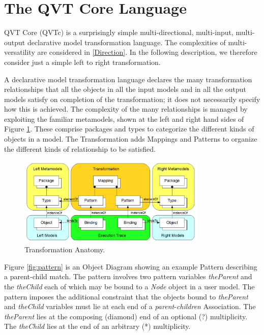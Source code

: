 %
\section{The QVT Core Language}\label{sec:qvtcore}
QVT Core (QVTc) is a surprisingly simple multi-directional, multi-input, multi-output declarative model transformation language. The complexities of multi-versatility are considered in \ref{Direction}. In the following description, we therefore consider just a simple left to right transformation.

A declarative model transformation language declares the many transformation relationships that all the objects in all the input models and in all the output models satisfy on completion of the transformation; it does not necessarily specify how this is achieved. The complexity of the many relationships is managed by exploiting the familiar metamodels, shown at the left and right hand sides of Figure \ref{fig:TransformationAnatomy}. These comprise packages and types to categorize the different kinds of objects in a model. The Transformation adds Mappings and Patterns to organize the different kinds of relationship to be satisfied.

\begin{figure}[h]
	\centering
	\includegraphics[width=0.8\textwidth]{TransformationAnatomy.png}
	\caption{Transformation Anatomy.}
	\label{fig:TransformationAnatomy}
\end{figure}


Figure \ref{fig:pattern} is an Object Diagram showing an example Pattern describing a parent-child match. The pattern involves two pattern variables \textit{theParent} and the \textit{theChild} each of which may be bound to a \textit{Node} object in a user model. The pattern imposes the additional constraint that the objects bound to \textit{theParent} and  \textit{theChild} variables must lie at each end of a \textit{parent}-\textit{children} Association. The \textit{theParent} lies at the composing (diamond) end of an optional (?) multiplicity.  The \textit{theChild} lies at the end of an arbitrary (*) multiplicity.

